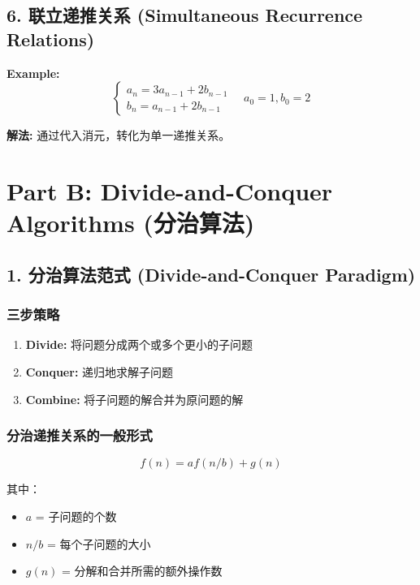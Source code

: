 \documentclass[10pt,a4paper,openany]{ctexbook}
\theoremstyle{definition}
\theoremstyle{remark}
\begin{document}
\subsection{6. 联立递推关系 (Simultaneous Recurrence Relations)}

\textbf{Example:}
\[
\begin{cases}
a_n = 3a_{n-1} + 2b_{n-1} \\
b_n = a_{n-1} + 2b_{n-1}
\end{cases}
\quad a_0 = 1, b_0 = 2
\]

\textbf{解法:} 通过代入消元，转化为单一递推关系。
\vspace{-2pt}

\section{Part B: Divide-and-Conquer Algorithms (分治算法)}

\subsection{1. 分治算法范式 (Divide-and-Conquer Paradigm)}

\subsubsection{三步策略}

\begin{enumerate}
\item \textbf{Divide:} 将问题分成两个或多个更小的子问题
\item \textbf{Conquer:} 递归地求解子问题
\item \textbf{Combine:} 将子问题的解合并为原问题的解

\end{enumerate}

\subsubsection{分治递推关系的一般形式}

\[
f(n) = a f(n/b) + g(n)
\]

其中：
\begin{itemize}
\item $a$ = 子问题的个数
\item $n/b$ = 每个子问题的大小
\item $g(n)$ = 分解和合并所需的额外操作数

\end{itemize}
\end{document}
